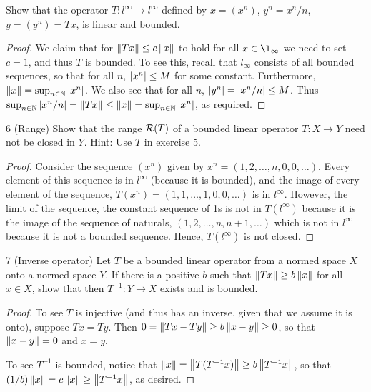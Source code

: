 \begin{exercise}{5}
Show that the operator $T:l^\infty\to l^\infty$ defined by $x=(x^n)$, $y^n=x^n/n$, $y =(y^n) =Tx$, is linear and bounded.
\end{exercise}
\begin{proof}
We claim that for $\left\lVert Tx\right\rVert\leq c\left\lVert x\right\rVert$ to hold for all $x\in\l_\infty$ we need to set $c=1$, and thus $T$ is bounded. 
To see this, recall that $l_\infty$ consists of all bounded sequences, so that for all $n$, $\left\lvert x^n\right\rvert\leq M$ for some constant. 
Furthermore, $\left\lVert x\right\rVert=\sup_{n\in\mathbb{N}}\left\lvert x^n\right\rvert$. 
We also see that for all $n$, $\left\lvert y^n\right\rvert=\left\lvert x^n/n\right\rvert\leq M$. 
Thus $\sup_{n\in\mathbb{N}}\left\lvert x^n/n\right\rvert =\left\lVert Tx\right\rVert \leq\left\lVert x\right\rVert =\sup_{n\in\mathbb{N}}\left\lvert x^n\right\rvert$, as required.
\end{proof}

\begin{exercise}{6 (Range)}
Show that the range $\mathcal{R}(T)$ of a bounded linear operator $T:X\to Y$ need not be closed in $Y$. 
Hint: Use $T$ in exercise 5.
\end{exercise}
\begin{proof}
Consider the sequence $(x^n)$ given by $x^n=(1,2,\dots,n,0,0,\dots)$. 
Every element of this sequence is in $l^\infty$ (because it is bounded), and the image of every element of the sequence, $T(x^n)=(1,1,\dots,1,0,0,\dots)$ is in $l^\infty$. 
However, the limit of the sequence, the constant sequence of 1s is not in $T(l^\infty)$ because it is the image of the sequence of naturals, $(1,2,\dots,n,n+1,\dots)$ which is not in $l^\infty$ because it is not a bounded sequence.
Hence, $T(l^\infty)$ is not closed.
\end{proof}

\begin{exercise}{7 (Inverse operator)}
Let $T$ be a bounded linear operator from a normed space $X$ onto a normed space $Y$. 
If there is a positive $b$ such that $\left\lVert Tx\right\rVert\geq b\left\lVert x\right\rVert$ for all $x\in X$, show that then $T^{-1}:Y\to X$ exists and is bounded.
\end{exercise}
\begin{proof}
To see $T$ is injective (and thus has an inverse, given that we assume it is onto), suppose $Tx=Ty$.
Then $0 =\left\lVert Tx-Ty\right\rVert \geq b\left\lVert x-y\right\rVert\geq 0$, so that $\left\lVert x-y\right\rVert=0$ and $x=y$.

To see $T^{-1}$ is bounded, notice that $\left\lVert x\right\rVert =\left\lVert T(T^{-1}x)\right\rVert \geq b\left\lVert T^{-1}x\right\rVert$, so that $(1/b)\left\lVert x\right\rVert =c\left\lVert x\right\rVert \geq \left\lVert T^{-1}x\right\rVert$, as desired.
\end{proof}

